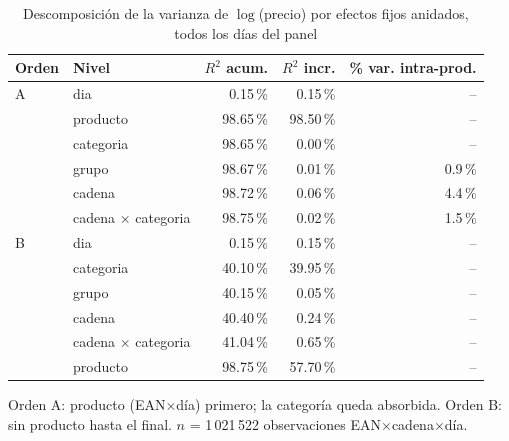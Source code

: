 \begin{table}[htbp]
\caption{Descomposici\'on de la varianza de $\log$(precio) por efectos fijos anidados, todos los d\'ias del panel}
\label{tab:varianza}
\centering\scriptsize\setlength{\tabcolsep}{3pt}
\begin{tabular}{@{}llrrr@{}}
\toprule
Orden & Nivel & $R^2$ acum. & $R^2$ incr. & \% var. intra-prod. \\
\midrule
A & dia & 0.15\,\% & 0.15\,\% & -- \\
 & producto & 98.65\,\% & 98.50\,\% & -- \\
 & categoria & 98.65\,\% & 0.00\,\% & -- \\
 & grupo & 98.67\,\% & 0.01\,\% & 0.9\,\% \\
 & cadena & 98.72\,\% & 0.06\,\% & 4.4\,\% \\
 & cadena $\times$ categoria & 98.75\,\% & 0.02\,\% & 1.5\,\% \\
\midrule
B & dia & 0.15\,\% & 0.15\,\% & -- \\
 & categoria & 40.10\,\% & 39.95\,\% & -- \\
 & grupo & 40.15\,\% & 0.05\,\% & -- \\
 & cadena & 40.40\,\% & 0.24\,\% & -- \\
 & cadena $\times$ categoria & 41.04\,\% & 0.65\,\% & -- \\
 & producto & 98.75\,\% & 57.70\,\% & -- \\
\bottomrule\end{tabular}
\par\smallskip\raggedright\scriptsize Orden A: producto (EAN$\times$d\'ia) primero; la categor\'ia queda absorbida. Orden B: sin producto hasta el final. $n$ = 1\,021\,522 observaciones EAN$\times$cadena$\times$d\'ia.
\end{table}
